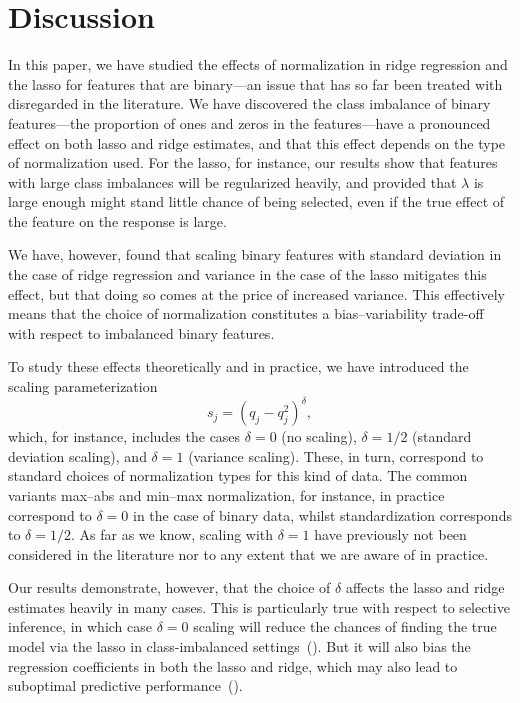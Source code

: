 \section{Discussion}\label{sec:discussion}

In this paper, we have studied the effects of normalization in ridge regression and the
lasso for features that are binary---an issue that has so far been treated with disregarded
in the literature. We have discovered the class imbalance of binary features---the
proportion of ones and zeros in the features---have a pronounced effect on both lasso and
ridge estimates, and that this effect depends on the type of normalization used. For the
lasso, for instance, our results show that features with large class imbalances will be
regularized heavily, and provided that \(\lambda\) is large enough might stand little
chance of being selected, even if the true effect of the feature on the response is large.

We have, however, found that scaling binary features with standard deviation in the case of
ridge regression and variance in the case of the lasso mitigates this effect, but that
doing so comes at the price of increased variance. This effectively means that the choice
of normalization constitutes a bias--variability trade-off with respect to imbalanced
binary features.

To study these effects theoretically and in practice, we have introduced the scaling
parameterization
\[
  s_j = (q_j - q_j^2)^\delta,
\]
which, for instance, includes the cases \(\delta=0\) (no scaling), \(\delta = 1/2\)
(standard deviation scaling), and \(\delta=1\) (variance scaling). These, in turn,
correspond to standard choices of normalization types for this kind of data. The common
variants max--abs and min--max normalization, for instance, in practice correspond to
\(\delta = 0\) in the case of binary data, whilst standardization corresponds to \(\delta =
1/2\). As far as we know, scaling with \(\delta=1\) have previously not been considered in
the literature nor to any extent that we are aware of in practice.

Our results demonstrate, however, that the choice of \(\delta\) affects the lasso and ridge
estimates heavily in many cases. This is particularly true with respect to selective
inference, in which case \(\delta=0\) scaling will reduce the chances of finding the true
model via the lasso in class-imbalanced settings~(). But it
will also bias the regression coefficients in both the lasso and ridge, which may also lead
to suboptimal predictive performance~().

